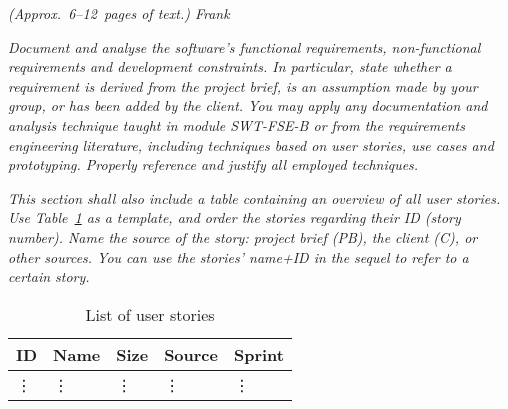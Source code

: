 \flushleft
\emph{(Approx.~6--12~pages of text.) Frank}

\emph{Document and analyse the software's functional requirements, 
non-functional requirements and development constraints. In particular, state 
whether a requirement is derived from the project brief, is an assumption made 
by your group, or has been added by the client. You may apply any documentation 
and analysis technique taught in module SWT-FSE-B or from the 
requirements engineering literature, including techniques based on user stories, 
use cases and prototyping. Properly reference and justify all employed 
techniques.}

\emph{This section shall also include a table containing an overview of all user 
stories. Use Table~\ref{tab:user_stories} as a template, and order the stories 
regarding their ID (story number). Name the source of the story: project brief 
(PB), the client (C), or other sources. You can use the stories' name+ID in the 
sequel to refer to a certain story.}

\begin{table}[!h]
  \caption{List of user stories}
  \centering
  \begin{tabular}{l||l|l|l|l|}
    ID & Name & Size &  Source & Sprint\\
    \hline
    \vdots&\vdots&\vdots&\vdots&\vdots\\
  \end{tabular}
  \label{tab:user_stories}
\end{table}
